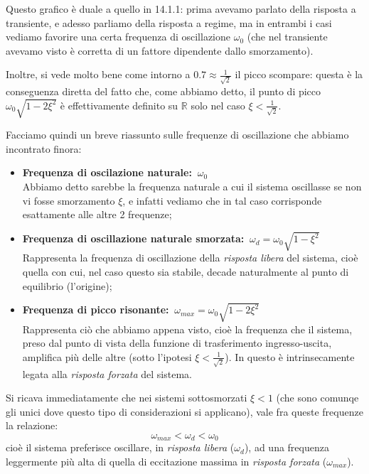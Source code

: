 \documentclass[a4paper,11pt]{article}
\begin{document}
\par\bigskip

Questo grafico è duale a quello in 14.1.1: prima avevamo parlato della risposta a transiente, e adesso parliamo della risposta a regime, ma in entrambi i casi vediamo favorire una certa frequenza di oscillazione $\omega_0$ (che nel transiente avevamo visto è corretta di un fattore dipendente dallo smorzamento).

Inoltre, si vede molto bene come intorno a $0.7 \approx \frac{1}{\sqrt{2}}$ il picco scompare: questa è la conseguenza diretta del fatto che, come abbiamo detto, il punto di picco $\omega_0 \sqrt{1 - 2 \xi^2}$ è effettivamente definito su $\mathbb{R}$ solo nel caso $\xi < \frac{1}{\sqrt{2}}$.

\par\smallskip

Facciamo quindi un breve riassunto sulle frequenze di oscillazione che abbiamo incontrato finora:
\begin{itemize}
	\item \textbf{Frequenza di oscilazione naturale:} $\ \omega_0$ \\
		Abbiamo detto sarebbe la frequenza naturale a cui il sistema oscillasse se non vi fosse smorzamento $\xi$, e infatti vediamo che in tal caso corrisponde esattamente alle altre 2 frequenze; 
	\item \textbf{Frequenza di oscillazione naturale smorzata:} $\ \omega_d = \omega_0 \sqrt{1 - \xi^2}$ \\
		Rappresenta la frequenza di oscillazione della \textit{risposta libera} del sistema, cioè quella con cui, nel caso questo sia stabile, decade naturalmente al punto di equilibrio (l'origine); 
	\item \textbf{Frequenza di picco risonante:} $\ \omega_{max} = \omega_0 \sqrt{1 - 2 \xi^2}$ \\
		Rappresenta ciò che abbiamo appena visto, cioè la frequenza che il sistema, preso dal punto di vista della funzione di trasferimento ingresso-uscita, amplifica più delle altre (sotto l'ipotesi $\xi < \frac{1}{\sqrt2}$). In questo è intrinsecamente legata alla \textit{risposta forzata} del sistema.
\end{itemize}

Si ricava immediatamente che nei sistemi sottosmorzati $\xi < 1$ (che sono comunqe gli unici dove questo tipo di considerazioni si applicano), vale fra queste frequenze la relazione:
$$
\omega_{max} < \omega_d < \omega_0
$$
cioè il sistema preferisce oscillare, in \textit{risposta libera} ($\omega_d$), ad una frequenza leggermente più alta di quella di eccitazione massima in \textit{risposta forzata} ($\omega_{max}$).
\end{document}
